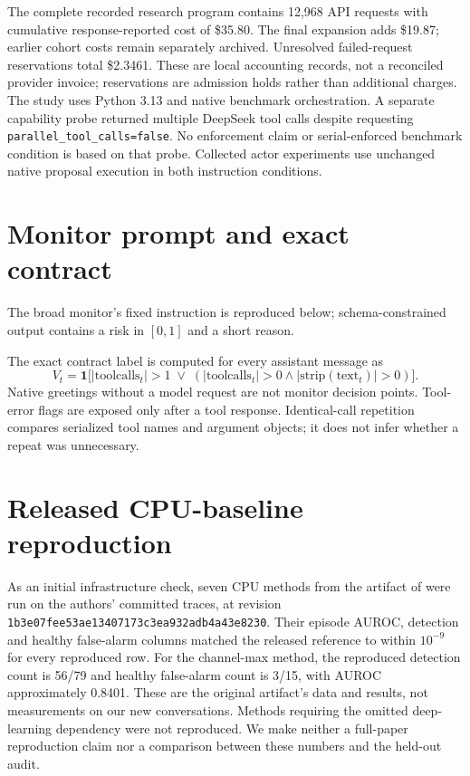 \documentclass[10pt]{article}
\newcommand{\ind}{\mathbf{1}}
\begin{document}
The complete recorded research program contains 12,968 API requests with cumulative response-reported cost of \$35.80. The final expansion adds \$19.87; earlier cohort costs remain separately archived. Unresolved failed-request reservations total \$2.3461. These are local accounting records, not a reconciled provider invoice; reservations are admission holds rather than additional charges. The study uses Python 3.13 and native benchmark orchestration. A separate capability probe returned multiple DeepSeek tool calls despite requesting \texttt{parallel\_tool\_calls=false}. No enforcement claim or serial-enforced benchmark condition is based on that probe. Collected actor experiments use unchanged native proposal execution in both instruction conditions.

\section{Monitor prompt and exact contract}
The broad monitor's fixed instruction is reproduced below; schema-constrained output contains a risk in $[0,1]$ and a short reason.
\begin{quote}\small

\end{quote}
The exact contract label is computed for every assistant message as
\[
 V_t=\ind\bigl[|\mathrm{toolcalls}_t|>1\;\lor\;
 (|\mathrm{toolcalls}_t|>0\land |\mathrm{strip}(\mathrm{text}_t)|>0)\bigr].
\]
Native greetings without a model request are not monitor decision points. Tool-error flags are exposed only after a tool response. Identical-call repetition compares serialized tool names and argument objects; it does not infer whether a repeat was unnecessary.

\section{Released CPU-baseline reproduction}
\label{app:reproduction}
As an initial infrastructure check, seven CPU methods from the artifact of \citet{dubey2026monitor} were run on the authors' committed traces, at revision \texttt{1b3e07fee53ae13407173c3ea932adb4a43e8230}. Their episode AUROC, detection and healthy false-alarm columns matched the released reference to within $10^{-9}$ for every reproduced row. For the channel-max method, the reproduced detection count is 56/79 and healthy false-alarm count is 3/15, with AUROC approximately 0.8401. These are the original artifact's data and results, not measurements on our new conversations. Methods requiring the omitted deep-learning dependency were not reproduced. We make neither a full-paper reproduction claim nor a comparison between these numbers and the held-out audit.
\end{document}
